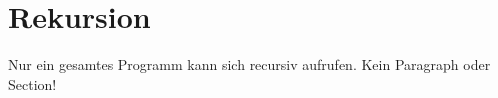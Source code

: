 \section{Rekursion}

Nur ein gesamtes Programm kann sich recursiv aufrufen. Kein Paragraph oder Section!
